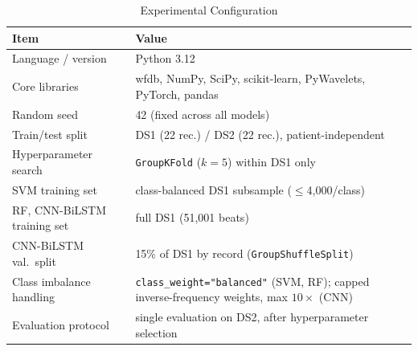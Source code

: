 \begin{table}[t]
\caption{Experimental Configuration}
\label{tab:setup}
\centering
\begin{tabular}{@{}p{}p{}@{}}
\toprule
\textbf{Item} & \textbf{Value} \\
\midrule
Language / version & Python 3.12 \\
Core libraries & wfdb, NumPy, SciPy, scikit-learn, PyWavelets, PyTorch, pandas \\
Random seed & 42 (fixed across all models) \\
Train/test split & DS1 (22 rec.) / DS2 (22 rec.), patient-independent \\
Hyperparameter search & \texttt{GroupKFold} ($k{=}5$) within DS1 only \\
SVM training set & class-balanced DS1 subsample ($\leq$4,000/class) \\
RF, CNN-BiLSTM training set & full DS1 (51,001 beats) \\
CNN-BiLSTM val.\ split & 15\% of DS1 by record (\texttt{GroupShuffleSplit}) \\
Class imbalance handling & \texttt{class\_weight="balanced"} (SVM, RF); capped inverse-frequency weights, max $10\times$ (CNN) \\
Evaluation protocol & single evaluation on DS2, after hyperparameter selection \\
\bottomrule
\end{tabular}
\end{table}
